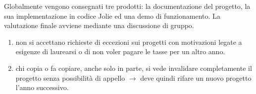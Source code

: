Globalmente vengono consegnati tre prodotti: la documentazione del progetto, la sua implementazione in codice Jolie ed una demo di funzionamento. La valutazione finale avviene mediante una discussione di gruppo.
\begin{tcolorbox}[colback=yellow!20!white,colframe=yellow!75!black,title=\textbf{N.B.}]
    \begin{enumerate}
        \item non si accettano richieste di eccezioni sui progetti con motivazioni legate a esigenze di laurearsi o di non voler pagare le tasse per un altro anno.
        \item chi copia o fa copiare, anche solo in parte, si vede invalidare completamente il progetto senza possibilità di appello $\rightarrow$ deve quindi rifare un nuovo progetto l'anno successivo.
    \end{enumerate}
\end{tcolorbox}


